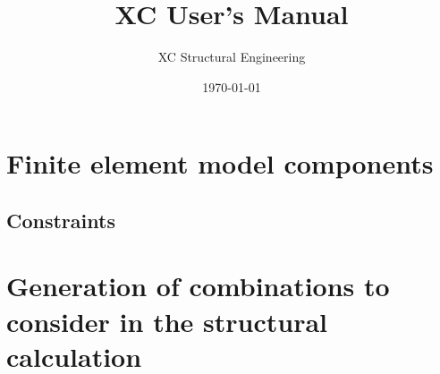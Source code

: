 \documentclass[a4paper,twoside]{book}
\title{XC User's Manual}
\author{XC Structural Engineering}
\date{\today}
\begin{document}
\maketitle
\lstset{language=Python}          %
\setcounter{secnumdepth}{4}
\setcounter{tocdepth}{4}
\tableofcontents
\listoftables


\chapter{Finite element model components}



\section{Constraints}







%







\appendix
\chapter{Generation of combinations to consider in the structural calculation}



\begin{thebibliography}{77}	%
\small				%

\end{thebibliography}
\end{document}
